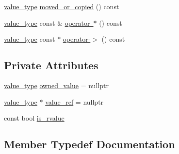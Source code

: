 \begin{DoxyCompactItemize}
\item 
\mbox{\hyperlink{classnlohmann_1_1detail_1_1json__ref_a78d76cf288141049568c0d670ed670ef}{value\+\_\+type}} \mbox{\hyperlink{classnlohmann_1_1detail_1_1json__ref_ae39e523218bf05cac3fb5b5b1cd5efb6}{moved\+\_\+or\+\_\+copied}} () const
\item 
\mbox{\hyperlink{classnlohmann_1_1detail_1_1json__ref_a78d76cf288141049568c0d670ed670ef}{value\+\_\+type}} const  \& \mbox{\hyperlink{classnlohmann_1_1detail_1_1json__ref_af96699d7e27c3b1f9d778fe142f8bb41}{operator $\ast$}} () const
\item 
\mbox{\hyperlink{classnlohmann_1_1detail_1_1json__ref_a78d76cf288141049568c0d670ed670ef}{value\+\_\+type}} const  $\ast$ \mbox{\hyperlink{classnlohmann_1_1detail_1_1json__ref_adb652774a67829876449dc0b30637456}{operator-\/$>$}} () const
\end{DoxyCompactItemize}
\subsection*{Private Attributes}
\begin{DoxyCompactItemize}
\item 
\mbox{\hyperlink{classnlohmann_1_1detail_1_1json__ref_a78d76cf288141049568c0d670ed670ef}{value\+\_\+type}} \mbox{\hyperlink{classnlohmann_1_1detail_1_1json__ref_a5d7bd67a5ab713d9be1e248cf9d509cd}{owned\+\_\+value}} = nullptr
\item 
\mbox{\hyperlink{classnlohmann_1_1detail_1_1json__ref_a78d76cf288141049568c0d670ed670ef}{value\+\_\+type}} $\ast$ \mbox{\hyperlink{classnlohmann_1_1detail_1_1json__ref_a23504615c2076070d5e087443bb376a4}{value\+\_\+ref}} = nullptr
\item 
const bool \mbox{\hyperlink{classnlohmann_1_1detail_1_1json__ref_a434d1e18c21cc1b61954ba22b62ee7a5}{is\+\_\+rvalue}}
\end{DoxyCompactItemize}


\subsection{Member Typedef Documentation}
\mbox{\label{classnlohmann_1_1detail_1_1json__ref_a78d76cf288141049568c0d670ed670ef}} 
